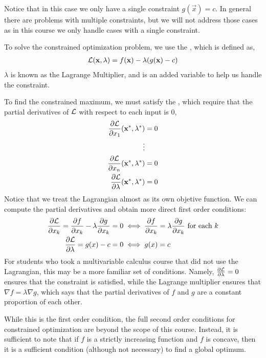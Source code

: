 Notice that in this case we only have a single constraint $g(\vec{x}) = c$. In general there are problems with multiple constraints, but we will not address those cases as in this course we only handle cases with a single constraint. 

To solve the constrained optimization problem, we use the , which is defined as,
\begin{align*}
    \mathcal{L}(\mathbf{x}, \lambda) = f(\mathbf{x}) - \lambda(g(\mathbf{x}) - c)
\end{align*}
$\lambda$ is known as the Lagrange Multiplier, and is an added variable to help us handle the constraint. 

To find the constrained maximum, we must satisfy the , which require that the partial derivatives of $\mathcal{L}$ with respect to each input is 0,
\begin{align*}
    \frac{\partial \mathcal{L}}{\partial x_1}(\mathbf{x}^*, \lambda^*) &= 0 \\
    \vdots \\
    \frac{\partial \mathcal{L}}{\partial x_n}(\mathbf{x}^*, \lambda^*) &= 0 \\
    \frac{\partial \mathcal{L}}{\partial \lambda}(\mathbf{x}^*, \lambda^*) &= 0
\end{align*}
Notice that we treat the Lagrangian almost as its own objetive function. We can compute the partial derivatives and obtain more direct first order conditions:
\begin{align*}
    \frac{\partial \mathcal{L}}{\partial x_k} = \frac{\partial f}{\partial x_k} - \lambda \frac{\partial g}{\partial x_k} = 0 &\iff \frac{\partial f}{\partial x_k} = \lambda \frac{\partial g}{\partial x_k} \text{ for each $k$}\\
    \frac{\partial \mathcal{L}}{\partial \lambda} = g(x) - c = 0 &\iff g(x) = c
\end{align*}
For students who took a multivariable calculus course that did not use the Lagrangian, this may be a more familiar set of conditions. Namely, $\frac{\partial \mathcal{L}}{\partial \lambda} = 0$ ensures that the constraint is satisfied, while the Lagrange multiplier ensures that $\nabla f = \lambda \nabla g$, which says that the partial derivatives of $f$ and $g$ are a constant proportion of each other.

While this is the first order condition, the full second order conditions for constrained optimization are beyond the scope of this course. Instead, it is sufficient to note that if $f$ is a strictly increasing function and $f$ is concave, then it is a sufficient condition (although not necessary) to find a global optimum. 

